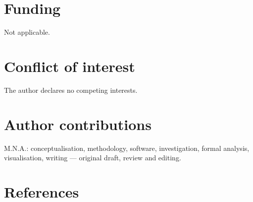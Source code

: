 \documentclass[
]{article}
\begin{document}
\hypertarget{funding}{%
\section{Funding}\label{funding}}

Not applicable.

\hypertarget{conflict-of-interest}{%
\section{Conflict of interest}\label{conflict-of-interest}}

The author declares no competing interests.

\hypertarget{author-contributions}{%
\section{Author contributions}\label{author-contributions}}

M.N.A.: conceptualisation, methodology, software, investigation, formal
analysis, visualisation, writing --- original draft, review and editing.

\hypertarget{references}{%
\section{References}\label{references}}
\end{document}
